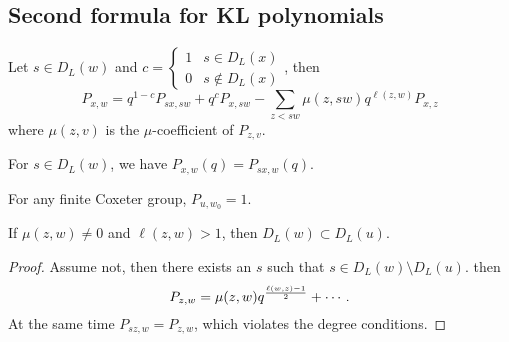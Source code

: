 \subsection{Second formula for KL polynomials}
Let $s\in D_L(w)$ and 
$c=\begin{cases}
	1&s\in D_L(x)\\0&s\notin D_L(x)
\end{cases}$, then
\[P_{x,w}=q^{1-c}P_{sx,sw}+q^cP_{x,sw}-\sum_{z<sw}\mu(z,sw)q^{\ell(z,w)}P_{x,z}\]
where $\mu(z,v)$ is the $\mu$-coefficient of $P_{z,v}$.

\begin{corollary}
	For $s\in D_L(w)$, we have $P_{x,w}(q)=P_{sx,w}(q)$.
\end{corollary}
\begin{corollary}
	For any finite Coxeter group, $P_{u,w_0}=1$. 
\end{corollary}
\begin{corollary}
	If $\mu(z,w)\neq 0$ and $\ell(z,w)>1$, then $D_L(w)\subset D_L(u)$.
\end{corollary}
\begin{proof}
	Assume not, then there exists an $s$ such that $s\in D_L(w)\setminus D_L(u)$. then
	\[P_{z,w}=\mu(z,w)q^{{\ell(w,z)-1\over 2}}+\cdots.\]
	At the same time $P_{sz,w}=P_{z,w}$, which violates the degree conditions.
\end{proof}